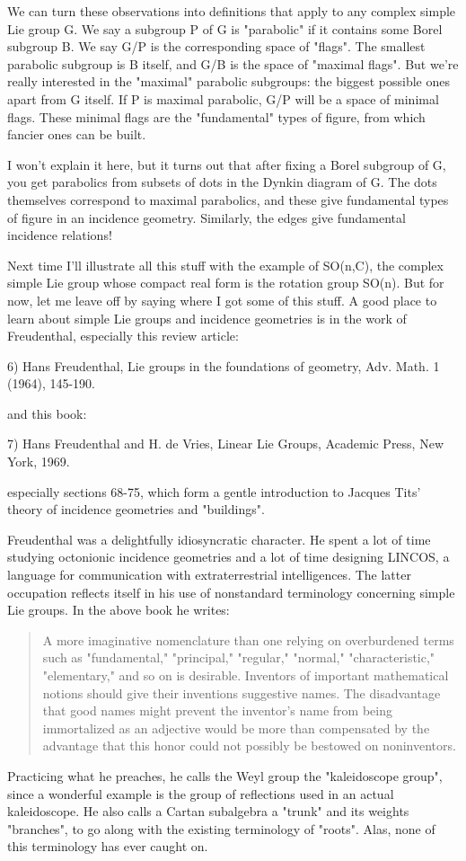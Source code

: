 We can turn these observations into definitions that apply to any
complex simple Lie group G.  We say a subgroup P of G is
"parabolic" if it contains some Borel subgroup B.  We say G/P
is the corresponding space of "flags".  The smallest parabolic
subgroup is B itself, and G/B is the space of "maximal flags".
But we're really interested in the "maximal" parabolic
subgroups: the biggest possible ones apart from G itself.  If P is
maximal parabolic, G/P will be a space of minimal flags.  These minimal
flags are the "fundamental" types of figure, from which
fancier ones can be built.

I won't explain it here, but it turns out that after fixing a Borel
subgroup of G, you get parabolics from subsets of dots in the Dynkin
diagram of G.  The dots themselves correspond to maximal parabolics, 
and these give fundamental types of figure in an incidence geometry.
Similarly, the edges give fundamental incidence relations!

Next time I'll illustrate all this stuff with the example of SO(n,C),
the complex simple Lie group whose compact real form is the rotation
group SO(n).  But for now, let me leave off by saying where I got some
of this stuff.  A good place to learn about simple Lie groups and
incidence geometries is in the work of Freudenthal, especially this
review article:

6) Hans Freudenthal, Lie groups in the foundations of geometry, Adv.
Math. 1 (1964), 145-190.  

and this book:

7) Hans Freudenthal and H. de Vries, Linear Lie Groups, Academic Press,
New York, 1969.

especially sections 68-75, which form a gentle introduction to Jacques
Tits' theory of incidence geometries and "buildings".  

Freudenthal was a delightfully idiosyncratic character.  He spent a lot
of time studying octonionic incidence geometries and a lot of time
designing LINCOS, a language for communication with extraterrestrial
intelligences.  The latter occupation reflects itself in his use of
nonstandard terminology concerning simple Lie groups.  In the above book
he writes:

\begin{quote}
     A more imaginative nomenclature than one relying on overburdened 
     terms such as "fundamental," "principal," "regular," "normal,"
     "characteristic," "elementary," and so on is desirable.  Inventors
     of important mathematical notions should give their inventions 
     suggestive names.  The disadvantage that good names might prevent
     the inventor's name from being immortalized as an adjective would
     be more than compensated by the advantage that this honor could
     not possibly be bestowed on noninventors.
\end{quote}
Practicing what he preaches, he calls the Weyl group the "kaleidoscope 
group", since a wonderful example is the group of reflections used in
an actual kaleidoscope.  He also calls a Cartan subalgebra a "trunk"
and its weights "branches", to go along with the existing terminology
of "roots".  Alas, none of this terminology has ever caught on.

